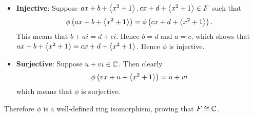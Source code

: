 \begin{questions}
\begin{itemize}
        \item \textbf{Injective}: Suppose $ax + b + \left\langle x^2+1\right\rangle, cx + d + \left\langle x^2+1\right\rangle \in F$ such that
        \[
            \phi\left(ax + b + \left\langle x^2+1\right\rangle\right) = \phi\left(cx + d + \left\langle x^2+1\right\rangle\right).
        \]
        This means that $b + ai = d + ci$. Hence $b = d$ and $a = c$, which shows that $ax + b + \left\langle x^2+1\right\rangle = cx + d + \left\langle x^2+1\right\rangle$. Hence $\phi$ is injective.

        \item \textbf{Surjective}: Suppose $u + vi \in \mathbb{C}$. Then clearly
        \[
            \phi\left(vx + u + \left\langle x^2+1\right\rangle\right) = u + vi
        \]
        which means that $\phi$ is surjective.
    \end{itemize}
    Therefore $\phi$ is a well-defined ring isomorphism, proving that $F \cong \mathbb{C}$.
\end{questions}
